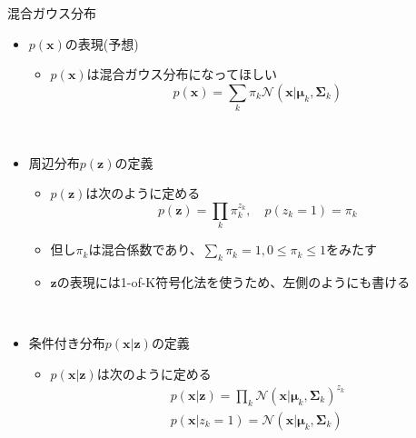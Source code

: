 \documentclass[dvipdfmx,notheorems,t]{beamer}
\begin{document}
\begin{frame}{混合ガウス分布}

\begin{itemize}
	\item $p(\bm{x})$の表現(予想)
	\begin{itemize}
		\item $p(\bm{x})$は混合ガウス分布になってほしい
		\begin{equation}
			p(\bm{x}) = \sum_k \pi_k \mathcal{N}(\bm{x} | \bm{\mu}_k, \bm{\Sigma}_k)
		\end{equation}
	\end{itemize} \
	
	\item 周辺分布$p(\bm{z})$の定義
	\begin{itemize}
		\item $p(\bm{z})$は次のように定める
		\begin{equation}
			p(\bm{z}) = \prod_k \pi_k^{z_k}, \quad p(z_k = 1) = \pi_k
		\end{equation}
		\item 但し$\pi_k$は混合係数であり、$\sum_k \pi_k = 1, 0 \le \pi_k \le 1$をみたす
		\item $\bm{z}$の表現には1-of-K符号化法を使うため、左側のようにも書ける
	\end{itemize} \
	
	\framebreak
	
	\item 条件付き分布$p(\bm{x} | \bm{z})$の定義
	\begin{itemize}
		\item $p(\bm{x} | \bm{z})$は次のように定める
		\begin{eqnarray}
			p(\bm{x} | \bm{z}) = \prod_k \mathcal{N}(\bm{x} | \bm{\mu}_k, \bm{\Sigma}_k)^{z_k} \\
			p(\bm{x} | z_k = 1) = \mathcal{N}(\bm{x} | \bm{\mu}_k, \bm{\Sigma}_k)
		\end{eqnarray}
	\end{itemize} \
	

\end{itemize}
\end{frame}
\end{document}
